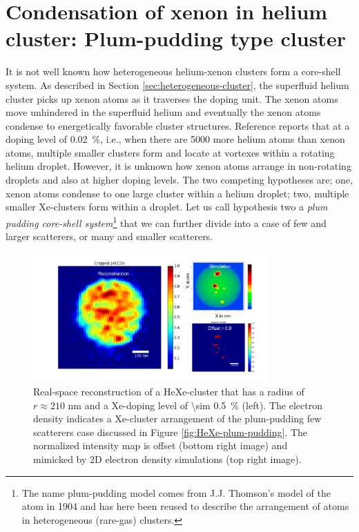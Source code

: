 \section{Condensation of xenon in helium cluster: Plum-pudding type cluster}\label{sec:helium-data}
It is not well known how heterogeneous helium-xenon clusters form a core-shell system. As described in Section \ref{sec:heterogeneous-cluster}, the superfluid helium cluster picks up xenon atoms as it traverses the doping unit. The xenon atoms move unhindered in the superfluid helium and eventually the xenon atoms condense to energetically favorable cluster structures. Reference \citep{Gomez-2014-Science} reports that at a doping level of \SI{0.02}{\percent}, i.e., when there are 5000 more helium atoms than xenon atoms, multiple smaller clusters form and locate at vortexes within a rotating helium droplet. However, it is unknown how xenon atoms arrange in non-rotating droplets and also at higher doping levels. The two competing hypotheses are; one, xenon atoms condense to one large cluster within a helium droplet; two, multiple smaller Xe-clusters form within a droplet. Let us call hypothesis two a \textit{plum pudding core-shell system}\footnote{The name plum-pudding model comes from J.J. Thomson's model of the atom in 1904 and has here been reused to describe the arrangement of atoms in heterogeneous (rare-gas) clusters.} that we can further divide into a case of few and larger scatterers, or many and smaller scatterers.\\[1\baselineskip]
\begin{figure}
 	\centering
 		\includegraphics[width=0.80\textwidth]{images/results/reconstructions-to-simulations.png}
 	\caption[Reconstruction of HeXe-clusters and simulated electron densities.]{Real-space reconstruction of a HeXe-cluster that has a radius of $r\approx 210$ nm and a Xe-doping level of \SI{\sim 0.5}{\percent} (left). The electron density indicates a Xe-cluster arrangement of the plum-pudding few scatterers case discussed in Figure \ref{fig:HeXe-plum-pudding}. The normalized intensity map is offset (bottom right image) and mimicked by 2D electron density simulations (top right image).}
 	\label{fig:HeXe-cluster-60}
\end{figure}
